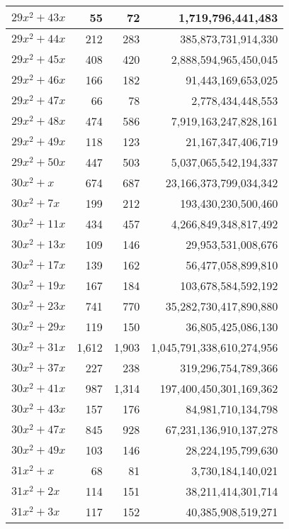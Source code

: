 \documentclass[a4paper]{amsproc}
\theoremstyle{plain}
\theoremstyle{named}
\begin{document}
\begin{longtable}{ | l | r | r | r | }
$29x^2 + 43x$ & 55 & 72 & 1{,}719{,}796{,}441{,}483 \\ \hline
$29x^2 + 44x$ & 212 & 283 & 385{,}873{,}731{,}914{,}330 \\ \hline
$29x^2 + 45x$ & 408 & 420 & 2{,}888{,}594{,}965{,}450{,}045 \\ \hline
$29x^2 + 46x$ & 166 & 182 & 91{,}443{,}169{,}653{,}025 \\ \hline
$29x^2 + 47x$ & 66 & 78 & 2{,}778{,}434{,}448{,}553 \\ \hline
$29x^2 + 48x$ & 474 & 586 & 7{,}919{,}163{,}247{,}828{,}161 \\ \hline
$29x^2 + 49x$ & 118 & 123 & 21{,}167{,}347{,}406{,}719 \\ \hline
$29x^2 + 50x$ & 447 & 503 & 5{,}037{,}065{,}542{,}194{,}337 \\ \hline
$30x^2 + x$ & 674 & 687 & 23{,}166{,}373{,}799{,}034{,}342 \\ \hline
$30x^2 + 7x$ & 199 & 212 & 193{,}430{,}230{,}500{,}460 \\ \hline
$30x^2 + 11x$ & 434 & 457 & 4{,}266{,}849{,}348{,}817{,}492 \\ \hline
$30x^2 + 13x$ & 109 & 146 & 29{,}953{,}531{,}008{,}676 \\ \hline
$30x^2 + 17x$ & 139 & 162 & 56{,}477{,}058{,}899{,}810 \\ \hline
$30x^2 + 19x$ & 167 & 184 & 103{,}678{,}584{,}592{,}192 \\ \hline
$30x^2 + 23x$ & 741 & 770 & 35{,}282{,}730{,}417{,}890{,}880 \\ \hline
$30x^2 + 29x$ & 119 & 150 & 36{,}805{,}425{,}086{,}130 \\ \hline
$30x^2 + 31x$ & 1{,}612 & 1{,}903 & 1{,}045{,}791{,}338{,}610{,}274{,}956 \\ \hline
$30x^2 + 37x$ & 227 & 238 & 319{,}296{,}754{,}789{,}366 \\ \hline
$30x^2 + 41x$ & 987 & 1{,}314 & 197{,}400{,}450{,}301{,}169{,}362 \\ \hline
$30x^2 + 43x$ & 157 & 176 & 84{,}981{,}710{,}134{,}798 \\ \hline
$30x^2 + 47x$ & 845 & 928 & 67{,}231{,}136{,}910{,}137{,}278 \\ \hline
$30x^2 + 49x$ & 103 & 146 & 28{,}224{,}195{,}799{,}630 \\ \hline
$31x^2 + x$ & 68 & 81 & 3{,}730{,}184{,}140{,}021 \\ \hline
$31x^2 + 2x$ & 114 & 151 & 38{,}211{,}414{,}301{,}714 \\ \hline
$31x^2 + 3x$ & 117 & 152 & 40{,}385{,}908{,}519{,}271 \\ \hline

\end{longtable}
\end{document}
